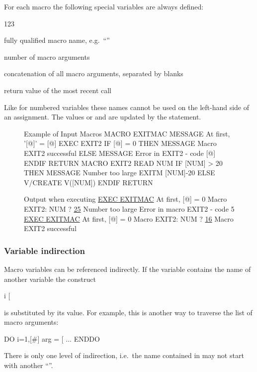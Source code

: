 For each macro the following special variables are always defined:
\begin{DLtt}{123}
\item[\Lit{[0]}] 
fully qualified macro name, e.g.\ ``''
\item[\Lit{[\#]}] 
number of macro arguments
\item[\Lit{[*]}] 
concatenation of all macro arguments, separated by blanks
\item[\Lit{[@]}]
return value of the most recent  call
\end{DLtt}
Like for numbered variables these names cannot be used on the
left-hand side of an assignment.
The values or \Lit{[\#]} and \Lit{[*]} are updated by the 
statement.

\begin{figure}[htb]\centering
\begin{XMPin}{Example of Input Macros}
MACRO EXITMAC                       
  MESSAGE At first, '[@]' = [@]
  EXEC EXIT2
  IF [@] = 0 THEN
     MESSAGE Macro EXIT2 successful
  ELSE
     MESSAGE Error in EXIT2 - code [@]
  ENDIF
RETURN
MACRO EXIT2
  READ NUM
  IF [NUM] > 20 THEN
     MESSAGE Number too large
     EXITM [NUM]-20
  ELSE
     V/CREATE V([NUM])
  ENDIF
RETURN
\end{XMPin}
\begin{XMPout}{Output when executing} 
\PROMPT{} \underline{EXEC EXITMAC}
At first, [@] = 0
Macro EXIT2: NUM ? \underline{25}
Number too large
Error in macro EXIT2 - code 5
\PROMPT{} \underline{EXEC EXITMAC}
At first, [@] = 0
Macro EXIT2: NUM ? \underline{16}
Macro EXIT2 successful
\end{XMPout}
\end{figure}


\subsubsection{Variable indirection} 

Macro variables can be referenced indirectly.
If the variable  contains the name of another variable the construct
\begin{Gray}{i}
[%
\end{Gray}
is substituted by its value. 
For example, this is another way to traverse the list of macro arguments:
\begin{XMP}
DO i=1,[#]
  arg = [%
  ...
ENDDO
\end{XMP}
There is only one level of indirection, i.e.\ the name contained in
 may not start with another ``\Lit{\%}''.


